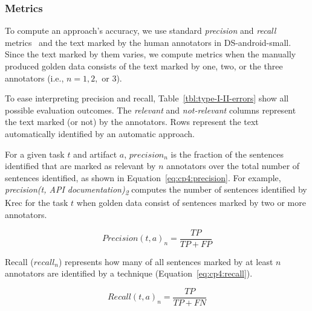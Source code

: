 




\subsubsection{Metrics}

To compute an approach's accuracy, we use standard \textit{precision} and \textit{recall} metrics~\cite{Manning2009IR} and the text marked by the human annotators in \acs{DS-android-small}.
Since the text marked by them varies, we compute metrics when the manually produced golden data consists of the text marked by one, two, or the three annotators (i.e., $n=1, 2,$ or $3$).




To ease interpreting precision and recall, Table~\ref{tbl:type-I-II-errors} show all possible evaluation outcomes. The \textit{relevant} and \textit{not-relevant} columns represent the text 
marked (or not) by the annotators. Rows represent the text automatically identified by an automatic approach.






For a given task $t$ and artifact $a$, $precision_n$ is the fraction of the sentences identified that are marked as relevant by $n$ annotators over the total number of sentences identified, as shown in Equation~\ref{eq:cp4:precision}. For example, \textit{precision(t, API documentation)\textsubscript{2}} computes the number of sentences identified by \acs{Krec} for the task $t$ when 
golden data consist of sentences marked by two or more annotators.


\begin{equation}
\label{eq:cp4:precision}    
    Precision(t, a)_n = \frac{TP}{TP + FP}
\end{equation}


Recall ($recall_n$) represents how many of all sentences marked by at least $n$ annotators are identified by a technique (Equation~\ref{eq:cp4:recall}).


\begin{equation}
\label{eq:cp4:recall}        
    Recall(t, a)_n = \frac{TP}{TP + FN}
\end{equation}


